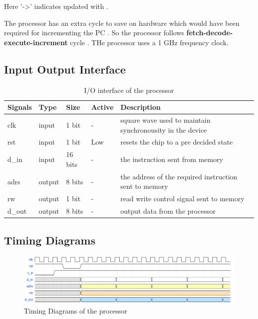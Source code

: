 \documentclass[11pt]{article}
\begin{document}
Here '->' indicates updated with .

The processor has an extra cycle to save on hardware which would have been required for incrementing the PC . So the processor follows \textbf{fetch-decode-execute-increment} cycle .
THe processor uses a 1 GHz frequency clock.
\vspace*{20mm}
\subsection{Input Output Interface}
\begin{table}[H]
  \begin{center}
    \caption{I/O interface of the processor}  
    \vspace*{5mm}
    \begin{tabularx}{\linewidth}{||l|l|l||l|X||}
      \hline
          {\bf Signals} & { \bf Type } & {\bf Size} & {\bf Active} &{\bf Description}   \\ \hline
            clk          & input  & 1 bit   & -     &  square wave used to maintain synchronousity in the device \\ \hline
            rst          & input  & 1 bit   & Low   &  resets the chip to a pre decided state \\ \hline
            [15:0] d\_in & input  & 16 bits & -     &  the instruction sent from memory \\ \hline
            [7:0] adrs   & output & 8 bits  & -     &  the address of the required instruction sent to memory \\ \hline
            rw           & output & 1 bit   & -     &  read write control signal sent to memory \\ \hline
            [7:0] d\_out & output & 8 bits  & -     &  output data from the processor \\ \hline
    \end{tabularx}
  \end{center}
\end{table}
\subsection{Timing Diagrams}
\begin{figure}[!h]
  \caption{Timing Diagrams of the processor}
  \includegraphics[scale=0.2]{timing_diag.jpg}
\end{figure}
\end{document}
